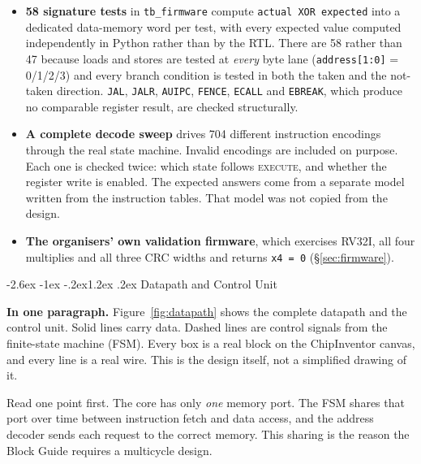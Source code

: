 \documentclass[11pt,a4paper]{article}
\makeatletter
\renewcommand\section{\@startsection{section}{1}{\z@}%
  {-2.6ex \@plus -1ex \@minus -.2ex}{1.2ex \@plus.2ex}%
  {\color{rvbl}\normalfont\large\bfseries}}
\makeatother
\begin{document}
\begin{itemize}
\item \textbf{58 signature tests} in \texttt{tb\_firmware} compute
  \texttt{actual XOR expected} into a dedicated data-memory word per test, with every
  expected value computed independently in Python rather than by the RTL. There are 58
  rather than 47 because loads and stores are tested at \emph{every} byte lane
  (\texttt{address[1:0]} = 0/1/2/3) and every branch condition is tested in both the taken
  and the not-taken direction. \texttt{JAL}, \texttt{JALR}, \texttt{AUIPC},
  \texttt{FENCE}, \texttt{ECALL} and \texttt{EBREAK}, which produce no comparable register
  result, are checked structurally.
\item \textbf{A complete decode sweep} drives 704 different instruction encodings through
  the real state machine. Invalid encodings are included on purpose. Each one is checked
  twice: which state follows \textsc{execute}, and whether the register write is enabled.
  The expected answers come from a separate model written from the instruction tables. That
  model was not copied from the design.
\item \textbf{The organisers' own validation firmware}, which exercises RV32I, all four
  multiplies and all three CRC widths and returns \texttt{x4 = 0} (\S\ref{sec:firmware}).
\end{itemize}


\section{Datapath and Control Unit}
\label{sec:datapath}

\textbf{In one paragraph.} Figure~\ref{fig:datapath} shows the complete datapath and the
control unit. Solid lines carry data. Dashed lines are control signals from the
finite-state machine (FSM). Every box is a real block on the ChipInventor canvas, and every
line is a real wire. This is the design itself, not a simplified drawing of it.

Read one point first. The core has only \emph{one} memory port. The FSM shares that port
over time between instruction fetch and data access, and the address decoder sends each
request to the correct memory. This sharing is the reason the Block Guide requires a
multicycle design.
\end{document}

